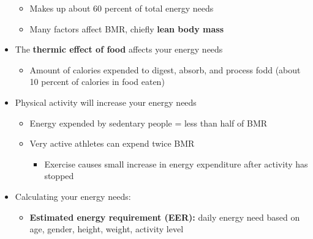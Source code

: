 \documentclass[12pt]{article}
\begin{document}
\begin{itemize}
\begin{itemize}
                        \item Makes up about 60 percent of total energy needs
                        \item Many factors affect BMR, chiefly \textbf{lean body mass}
                    \end{itemize}
                \item The \textbf{thermic effect of food} affects your energy needs
                    \begin{itemize}
                        \item Amount of calories expended to digest, absorb, and process fodd (about 10 percent of calories in food eaten)
                    \end{itemize}
                \item Physical activity will increase your energy needs
                    \begin{itemize}
                        \item Energy expended by sedentary people = less than half of BMR
                        \item Very active athletes can expend twice BMR
                            \begin{itemize}
                                \item Exercise causes small increase in energy expenditure after activity has stopped
                            \end{itemize}
                    \end{itemize}
                \item Calculating your energy needs:
                    \begin{itemize}
                        \item \textbf{Estimated energy requirement (EER):} daily energy need based on age, gender, height, weight, activity level
                    \end{itemize}
            \end{itemize}
\end{document}
